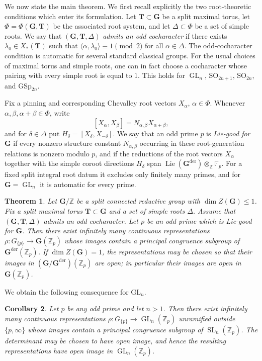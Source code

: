 \documentclass[11pt]{amsart}
\numberwithin{equation}{section}
\newcommand{\Z}{\mathbb Z}
\newcommand{\Fp}{\mathbb F_p}
\newcommand{\Zp}{\mathbb Z_p}
\newcommand{\GG}{\mathbf G}
\newcommand{\TT}{\mathbf T}
\newcommand{\Gder}{\mathbf G^{\mathrm{der}}}
\newcommand{\Lie}{\operatorname{Lie}}
\newcommand{\SL}{\operatorname{SL}}
\newcommand{\GL}{\operatorname{GL}}
\newtheorem{theorem}{Theorem}[section]
\newtheorem{corollary}[theorem]{Corollary}
\theoremstyle{definition}
\begin{document}
\par We now state the main theorem. We first recall explicitly the two
root-theoretic conditions which enter its formulation. Let
$\TT\subset\GG$ be a split maximal torus, let
$\Phi=\Phi(\GG,\TT)$ be the associated root system, and let
$\Delta\subset\Phi$ be a set of simple roots. We say that
$(\GG,\TT,\Delta)$ \emph{admits an odd cocharacter} if there exists
$\lambda_0\in X_*(\TT)$ such that $\langle\alpha,\lambda_0\rangle
        \equiv1\pmod 2$ for all $
        \alpha\in\Delta$. The odd-cocharacter condition is automatic for several standard
classical groups. For the usual choices of maximal torus and simple
roots, one can in fact choose a cocharacter whose pairing with every
simple root is equal to $1$.  This holds for $\GL_n$,
$\mathrm{SO}_{2n+1}$, $\mathrm{SO}_{2n}$, and $\mathrm{GSp}_{2n}$.
\par Fix a pinning and corresponding Chevalley root vectors
$X_\alpha$, $\alpha\in\Phi$. Whenever
$\alpha,\beta,\alpha+\beta\in\Phi$, write
\[
        [X_\alpha,X_\beta]
        =
        N_{\alpha,\beta}X_{\alpha+\beta},
\]
and for $\delta\in\Delta$ put
$H_\delta=[X_\delta,X_{-\delta}]$. We say that an odd prime $p$ is
\emph{Lie-good for $\GG$} if every nonzero structure constant
$N_{\alpha,\beta}$ occurring in these root-generation relations is
nonzero modulo $p$, and if the reductions of the root vectors
$X_\alpha$ together with the simple coroot directions $H_\delta$ span $\Lie(\Gder)\otimes_{\Z}\Fp$.
For a fixed split integral
root datum it excludes only finitely many primes, and for
$\GG=\GL_n$ it is automatic for every prime.

\begin{theorem}\label{thm:main}
Let $\GG/\Z$ be a split connected reductive group with
$\dim Z(\GG)\leq1$. Fix a split maximal torus $\TT\subset\GG$ and a
set of simple roots $\Delta$. Assume that $(\GG,\TT,\Delta)$ admits an
odd cocharacter. Let $p$ be an odd prime which is Lie-good for $\GG$.
Then there exist infinitely many continuous representations $\rho:G_{\{p\}}\longrightarrow\GG(\Zp)$
whose images contain a principal congruence subgroup of
$\Gder(\Zp)$. If $\dim Z(\GG)=1$, the representations may be chosen so
that their images in $(\GG/\Gder)(\Zp)$ are open; in particular their
images are open in $\GG(\Zp)$.
\end{theorem}

We obtain the following
consequence for $\mathrm{GL}_n$.

\begin{corollary}\label{cor:GLn}
Let $p$ be any odd prime and let $n>1$. Then there exist infinitely
many continuous representations $\rho:G_{\{p\}}\longrightarrow\GL_n(\Zp)$
unramified outside $\{p,\infty\}$ whose images contain a principal
congruence subgroup of $\SL_n(\Zp)$. The determinant may be chosen to
have open image, and hence the resulting representations have open
image in $\GL_n(\Zp)$.
\end{corollary}
\end{document}
